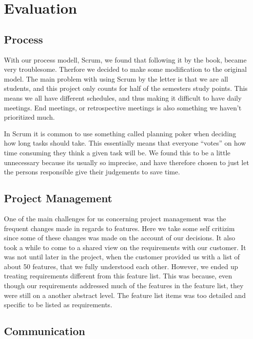 \section{Evaluation}
\thispagestyle{plain}
	\subsection{Process}

With our process modell, Scrum, we found that following it by the book, became very troublesome. Therfore we decided to make some modification to the original model. The main problem with using Scrum by the letter is that we are all students, and this project only counts for half of the semesters study points. This means we all have different schedules, and thus making it difficult to have daily meetings. End meetings, or retrospective meetings is also something we haven’t prioritized much.

In Scrum it is common to use something called planning poker when deciding how long tasks should take. This essentially means that everyone “votes” on how time consuming they think a given task will be. We found this to be a little unnecessary because its usually so imprecise, and have therefore chosen to just let the persons responsible give their judgements to save time. 

	\subsection{Project Management}

One of the main challenges for us concerning project management was the frequent changes made in regards to features. Here we take some self critizim since some of these changes was made on the account of our decisions. It also took a while to come to a shared view on the requirements with our customer. It was not until later in the project, when the customer provided us with a list of about 50 features, that we fully understood each other. However, we ended up treating requirements different from this feature list. This was because, even though our requirements addressed much of the features in the feature list, they were still on a another abstract level. The feature list items was too detailed and specific to be listed as requirements.

	\subsection{Communication}

